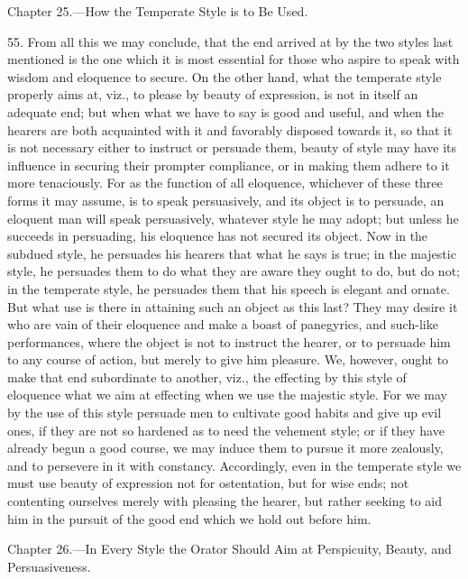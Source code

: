 
Chapter 25.—How the Temperate Style is to Be Used.

55. From all this we may conclude, that the end arrived at by the two styles last mentioned is the one which it is most essential for those who aspire to speak with wisdom and eloquence to secure. On the other hand, what the temperate style properly aims at, viz., to please by beauty of expression, is not in itself an adequate end; but when what we have to say is good and useful, and when the hearers are both acquainted with it and favorably disposed towards it, so that it is not necessary either to instruct or persuade them, beauty of style may have its influence in securing their prompter compliance, or in making them adhere to it more tenaciously. For as the function of all eloquence, whichever of these three forms it may assume, is to speak persuasively, and its object is to persuade, an eloquent man will speak persuasively, whatever style he may adopt; but unless he succeeds in persuading, his eloquence has not secured its object. Now in the subdued style, he persuades his hearers that what he says is true; in the majestic style, he persuades them to do what they are aware they ought to do, but do not; in the temperate style, he persuades them that his speech is elegant and ornate. But what use is there in attaining such an object as this last? They may desire it who are vain of their eloquence and make a boast of panegyrics, and such-like performances, where the object is not to instruct the hearer, or to persuade him to any course of action, but merely to give him pleasure. We, however, ought to make that end subordinate to another, viz., the effecting by this style of eloquence what we aim at effecting when we use the majestic style. For we may by the use of this style persuade men to cultivate good habits and give up evil ones, if they are not so hardened as to need the vehement style; or if they have already begun a good course, we may induce them to pursue it more zealously, and to persevere in it with constancy. Accordingly, even in the temperate style we must use beauty of expression not for ostentation, but for wise ends; not contenting ourselves merely with pleasing the hearer, but rather seeking to aid him in the pursuit of the good end which we hold out before him.


Chapter 26.—In Every Style the Orator Should Aim at Perspicuity, Beauty, and Persuasiveness.

